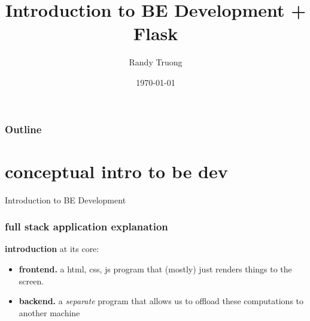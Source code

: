 \documentclass{beamer}
\title[Intro to BE + Flask]{Introduction to BE Development + Flask} %
\author{Randy Truong}  %
\institute[] %
{
\textit{rtruong@u.northwestern.edu} %
}
\date{\today } %
\begin{document}
\begin{frame}
\titlepage %
\end{frame}

\begin{frame}
\frametitle{Outline} %
\tableofcontents %
\end{frame}


\section{conceptual intro to be dev} %


\begin{frame}
\begin{center}
\Huge Introduction to BE Development
\end{center}
\end{frame}



\begin{frame}
\frametitle{full stack application explanation}
\begin{block}{\textbf{introduction}}
  at its core:
  \begin{itemize}
    \item \textbf{frontend.} a html, css, js program that (mostly) just
          renders things to the screen.
    \item \textbf{backend.} a \textit{separate} program that allows us
          to offload these computations to another machine
  \end{itemize}

\end{block}
\end{frame}
\end{document}
